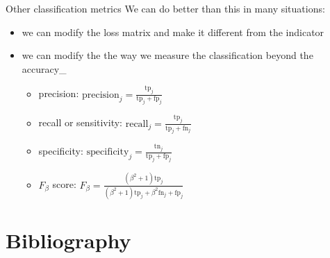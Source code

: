 \documentclass{beamer}
\begin{document}
\begin{frame}{Other classification metrics}
  We can do better than this in many situations:
  \begin{itemize}
    \item we can modify the loss matrix and make it different from the indicator
    \item we can modify the the way we measure the classification beyond the accuracy_
    \begin{itemize}
      \item precision: $\mathrm{precision}_j = \frac{\mathrm{tp}_j}{\mathrm{tp}_j+\mathrm{fp}_j}$
      \item recall or sensitivity: $\mathrm{recall}_j = \frac{\mathrm{tp}_j}{\mathrm{tp}_j+\mathrm{fn}_j}$
      \item specificity: $\mathrm{specificity}_j = \frac{\mathrm{tn}_j}{\mathrm{tp}_j+\mathrm{fp}_j}$
      \item $F_{\beta}$ score: $F_{\beta}=\frac{(\beta^2+1)\mathrm{tp}_j}{(\beta^2+1) \mathrm{tp}_j+\beta^2 \mathrm{fn}_j+\mathrm{fp}_j}$
    \end{itemize}
  \end{itemize}
\end{frame}

\section{Bibliography}


\end{document}
